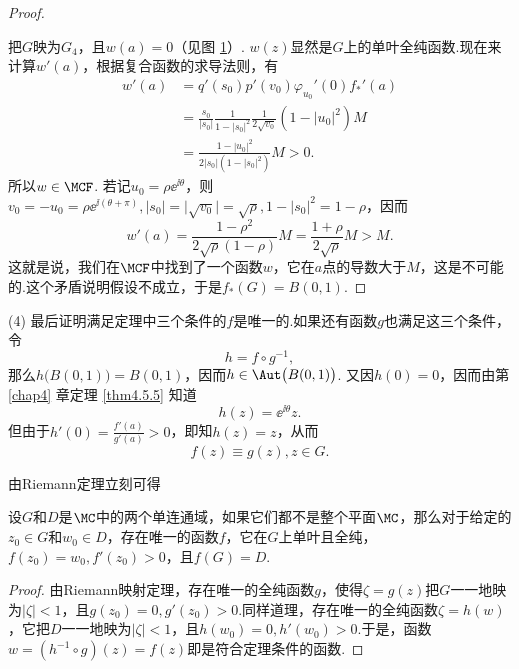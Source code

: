 \begin{proof}
\begin{figure}[!ht]
\caption{\label{fig7.1}}
\end{figure}
把$G$映为$G_4$，且$w(a)=0$（见图 \ref{fig7.1}）. $w(z)$显然是$G$上的单叶全纯函数.现在来计算$w'(a)$，根据复合函数的求导法则，有
\begin{align*}
w'(a)&=q'(s_0)p'(v_0)\varphi_{u_0}'(0)f_\ast'(a)\\
&=\frac{s_0}{|s_0|}\frac1{1-|s_0|^2}\frac1{2\sqrt{v_0}}(1-|u_0|^2)M\\
&=\frac{1-|u_0|^2}{2|s_0|(1-|s_0|^2)}M>0.
\end{align*}
所以$w\in\MCF$. 若记$u_0=\rho\ee^{\ii\theta}$，则$v_0=-u_0=\rho\ee^{\ii(\theta+\pi)},|s_0|=\big|\sqrt{v_0}\big|=\sqrt\rho
,1-|s_0|^2=1-\rho$，因而
\[w'(a)=\frac{1-\rho^2}{2\sqrt\rho(1-\rho)}M=\frac{1+\rho}{2\sqrt\rho}M>M.\]
这就是说，我们在$\MCF$中找到了一个函数$w$，它在$a$点的导数大于$M$，这是不可能的.这个矛盾说明假设不成立，于是$f_\ast(G)=B(0,1)$.
\end{proof}

(4) \hyperlink{thm7.2.1.4}{} 最后证明满足定理中三个条件的$f$是唯一的.如果还有函数$g$也满足这三个条件，令
\[h=f\circ g^{-1},\]
那么$h\big(B(0,1)\big)=B(0,1)$，因而$h\in\Aut\big(B(0,1)\big)$. 又因$h(0)=0$，因而由第 \ref{chap4} 章定理 \ref{thm4.5.5} 知道
\[h(z)=\ee^{\ii\theta}z.\]
但由于$h'(0)=\frac{f'(a)}{g'(a)}>0$，即知$h(z)=z$，从而
\begin{equation*}
f(z)\equiv g(z),z\in G.
\end{equation*}

由Riemann定理立刻可得
\begin{theorem}\label{thm7.2.2}
设$G$和$D$是$\MC$中的两个单连通域，如果它们都不是整个平面$\MC$，那么对于给定的$z_0\in G$和$w_0\in D$，存在唯一的函数$f$，它在$G$上单叶且全纯，$f(z_0)=w_0,f'(z_0)>0$，且$f(G)=D$.
\end{theorem}
\begin{proof}
由Riemann映射定理，存在唯一的全纯函数$g$，使得$\zeta=g(z)$把$G$一一地映为$|\zeta|<1$，且$g(z_0)=0,g'(z_0)>0$.同样道理，存在唯一的全纯函数$\zeta=h(w)$，它把$D$一一地映为$|\zeta|<1$，且$h(w_0)=0,h'(w_0)>0$.于是，函数$w=(h^{-1}\circ g)(z)=f(z)$即是符合定理条件的函数.
\end{proof}

